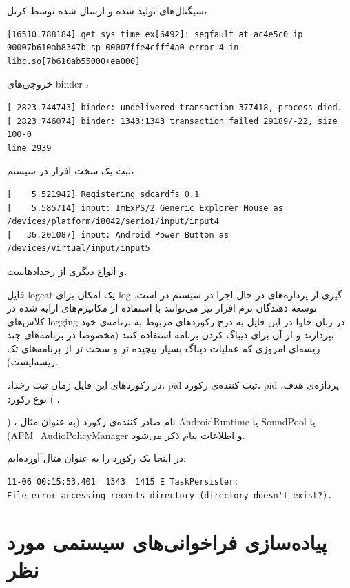 \documentclass{article}
\begin{document}
سیگنال‌های تولید شده و ارسال شده توسط کرنل،
\begin{latin}
\begin{verbatim}
[16510.788184] get_sys_time_ex[6492]: segfault at ac4e5c0 ip
00007b610ab8347b sp 00007ffe4cfff4a0 error 4 in libc.so[7b610ab55000+ea000]
\end{verbatim}
\end{latin}
خروجی‌های binder ،
\begin{latin}
\begin{verbatim}
[ 2823.744743] binder: undelivered transaction 377418, process died.
[ 2823.746074] binder: 1343:1343 transaction failed 29189/-22, size 100-0
line 2939
\end{verbatim}
\end{latin}
ثبت یک سخت افزار در سیستم،
\begin{latin}
\begin{verbatim}
[    5.521942] Registering sdcardfs 0.1
[    5.585714] input: ImExPS/2 Generic Explorer Mouse as
/devices/platform/i8042/serio1/input/input4
[   36.201087] input: Android Power Button as /devices/virtual/input/input5
\end{verbatim}
\end{latin}
و انواع دیگری از رخداد‌هاست.

فایل logcat یک امکان برای log گیری از پردازه‌های در حال اجرا در سیستم در  است. توسعه‌ دهندگان نرم افزار نیز می‌توانند با استفاده از مکانیزم‌های ارایه شده در کلاس‌های logging در زبان جاوا در این فایل به درج رکورد‌های مربوط به برنامه‌ی خود بپردازند و از آن برای دیباگ کردن برنامه استفاده کنند (مخصوصا در برنامه‌های چند ریسه‌ای امروزی که عملیات دیباگ بسیار پیچیده تر و سخت تر از برنامه‌های تک ریسه‌ایست).

در رکورد‌های این فایل زمان ثبت رخداد، pid ثبت کننده‌ی رکورد، pid پردازه‌ی هدف، نوع رکورد (
،

)
، نام صادر کننده‌ی رکورد (به عنوان مثال AndroidRuntime یا SoundPool یا (APM\_AudioPolicyManager و اطلاعات پیام ذکر می‌شود.

در اینجا یک رکورد را به عنوان مثال آورده‌ایم:
\begin{latin}
\begin{verbatim}
11-06 00:15:53.401  1343  1415 E TaskPersister:
File error accessing recents directory (directory doesn't exist?).
\end{verbatim}
\end{latin}



\section*{پیاده‌سازی فراخوانی‌های سیستمی مورد نظر}
\end{document}
